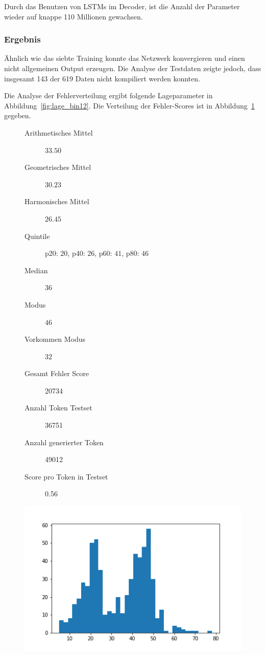 \documentclass[pdftex,a4paper,halfparskip, article]{scrartcl}
\begin{document}
Durch das Benutzen von LSTMs im Decoder, ist die Anzahl der Parameter wieder auf knappe 110 Millionen gewachsen.

\subsubsection*{Ergebnis}

Ähnlich wie das siebte Training konnte das Netzwerk konvergieren und einen nicht allgemeinen Output erzeugen. Die Analyse der Testdaten zeigte jedoch, dass insgesamt 143 der 619 Daten nicht kompiliert werden konnten. 

Die Analyse der Fehlerverteilung ergibt folgende Lageparameter in Abbildung~\ref{fig:lage_bin12}. Die Verteilung der Fehler-Scores ist in Abbildung~\ref{fig:hist_bin12} gegeben.

\begin{figure}
\centering
\begin{minipage}{.5\textwidth}
  \centering
  \begin{description}
	\item[Arithmetisches Mittel] $33.50$	
	\item[Geometrisches Mittel] $30.23$
	\item[Harmonisches Mittel] $26.45$
	\item[Quintile] p20: $20$, p40: $26$, p60: $41$, p80: $46$
	\item[Median] $36$
	\item[Modus] $46$
	\item[Vorkommen Modus] $32$
	\item[Gesamt Fehler Score] 20734
	\item[Anzahl Token Testset] 36751 
	\item[Anzahl generierter Token] 49012
	\item[Score pro Token in Testset] 0.56
\end{description}
  \label{fig:lage_bin12}
\end{minipage}%
\begin{minipage}{.5\textwidth}
  \centering
  \includegraphics[width=1\linewidth]{predictions_bin12_histogramm}
  \label{fig:hist_bin12}
\end{minipage}
\end{figure}
\end{document}
